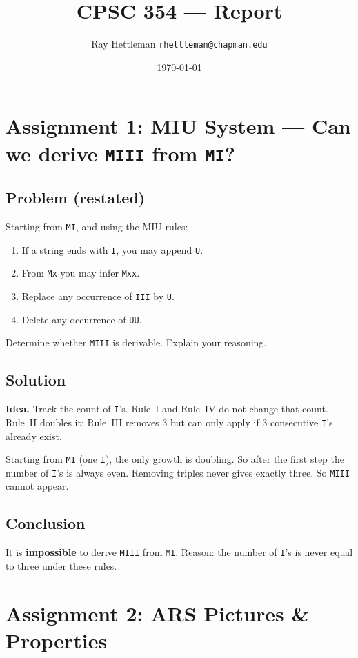 \documentclass[11pt]{article}
\title{CPSC 354 — Report}
\author{Ray Hettleman \quad \texttt{rhettleman@chapman.edu}}
\date{\today}
\begin{document}
\maketitle
\tableofcontents

\section{Assignment 1: MIU System — Can we derive \texttt{MIII} from \texttt{MI}?}

\subsection*{Problem (restated)}
Starting from \texttt{MI}, and using the MIU rules:
\begin{enumerate}[label=\Roman*.]
  \item If a string ends with \texttt{I}, you may append \texttt{U}.
  \item From \texttt{Mx} you may infer \texttt{Mxx}.
  \item Replace any occurrence of \texttt{III} by \texttt{U}.
  \item Delete any occurrence of \texttt{UU}.
\end{enumerate}
Determine whether \texttt{MIII} is derivable. Explain your reasoning.

\subsection*{Solution}
\textbf{Idea.} Track the count of \texttt{I}'s. Rule~I and Rule~IV do not change that count. Rule~II doubles it; Rule~III removes 3 but can only apply if 3 consecutive \texttt{I}'s already exist.

Starting from \texttt{MI} (one \texttt{I}), the only growth is doubling. So after the first step the number of \texttt{I}'s is always even. Removing triples never gives exactly three. So \texttt{MIII} cannot appear.

\subsection*{Conclusion}
It is \textbf{impossible} to derive \texttt{MIII} from \texttt{MI}.  
Reason: the number of \texttt{I}'s is never equal to three under these rules.

\section{Assignment 2: ARS Pictures \& Properties}
\end{document}
